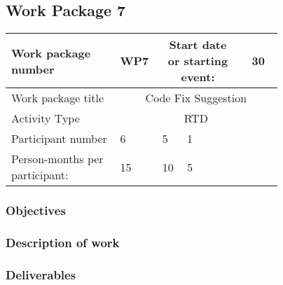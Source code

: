 \subsection{Work Package 7}

\begin{table}[hbpt]\centering
	\begin{tabular}{|p{0.35\linewidth}|p{0.06\linewidth}|p{0.06\linewidth}|p{0.06\linewidth}|
         p{0.06\linewidth}|p{0.06\linewidth}|p{0.06\linewidth}|p{0.06\linewidth}|}\hline
		 Work package number& WP7 &
		 \multicolumn{4}{|c|}{Start date or starting event:}{}&
		 \multicolumn{2}{|c|}{                        30 }{}\\\hline
		 Work package title&\multicolumn{7}{|c|}{ Code Fix Suggestion }{}\\\hline
		 Activity Type&\multicolumn{7}{|c|}{      RTD }{}\\\hline
		 Participant number & 6 & 5 & 1 & ~ & ~ & ~ & ~ \\\hline
		 Person-months per participant: & 15 & 10 & 5 & ~ & ~ & ~ & ~ \\\hline
	\end{tabular}
\end{table}

\subsubsection{Objectives}

\subsubsection{Description of work}

\subsubsection{Deliverables}
